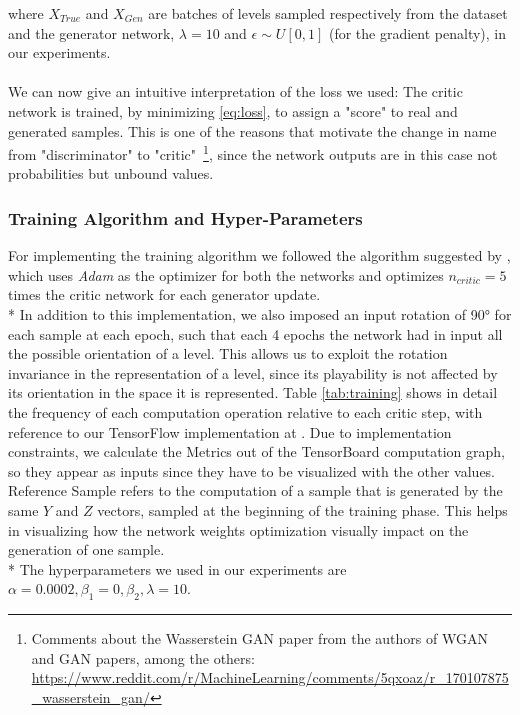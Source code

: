 where $X_{True}$ and $X_{Gen}$ are batches of levels sampled respectively from the dataset and the generator network, $\lambda = 10$ and $ \epsilon \sim U[0,1] $ (for the gradient penalty), in our experiments.

\paragraph{} We can now give an intuitive interpretation of the loss we used: The critic network is trained, by minimizing \ref{eq:loss}, to assign a "score" to real and generated samples. This is one of the reasons that motivate the change in name from "discriminator" to "critic"~\footnote{ Comments about the Wasserstein GAN paper from the authors of WGAN and GAN papers, among the others: \url{https://www.reddit.com/r/MachineLearning/comments/5qxoaz/r_170107875_wasserstein_gan/}}, since the network outputs are in this case not probabilities but unbound values.

\subsubsection{Training Algorithm and Hyper-Parameters}
For implementing the training algorithm we followed the algorithm suggested by \cite[alg.~1. p.~4]{wgangp}, which uses \textit{Adam}\cite{adam} as the optimizer for both the networks and optimizes $n_{critic} = 5$ times the critic network for each generator update. \\*
In addition to this implementation, we also imposed an input rotation of 90° for each sample at each epoch, such that each 4 epochs the network had in input all the possible orientation of a level. This allows us to exploit the rotation invariance in the representation of a level, since its playability is not affected by its orientation in the space it is represented. Table \ref{tab:training} shows in detail the frequency of each computation operation relative to each critic step, with reference to our TensorFlow implementation at \cite{gitrepo}. Due to implementation constraints, we calculate the Metrics out of the TensorBoard computation graph, so they appear as inputs since they have to be visualized with the other values. Reference Sample refers to the computation of a sample that is generated by the same $Y$ and $Z$ vectors, sampled at the beginning of the training phase. This helps in visualizing how the network weights optimization visually impact on the generation of one sample. \\*
The  hyperparameters we used in our experiments are $\alpha=0.0002, \beta_1=0, \beta_2, \lambda=10$.

